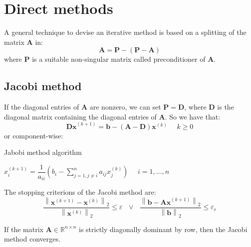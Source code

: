 \documentclass[12pt, a4paper]{report}
\begin{document}
    \section{Direct methods}
    A general technique to devise an iterative method is based on a splitting of the matrix $\boldsymbol{A}$ in: 
    \[\boldsymbol{A}=\boldsymbol{P}-\left(\boldsymbol{P}-\boldsymbol{A}\right)\]
    where $\boldsymbol{P}$ is a suitable non-singular matrix called preconditioner of $\boldsymbol{A}$. 

    \subsection{Jacobi method}
    If the diagonal entries of $\boldsymbol{A}$ are nonzero, we can set $\boldsymbol{P}=\boldsymbol{D}$, where $\boldsymbol{D}$ is the diagonal matrix containing the diagonal 
    entries of $\boldsymbol{A}$. So we have that: 
    \[\boldsymbol{Dx}^{(k+1)}=\boldsymbol{b}-\left( \boldsymbol{A}-\boldsymbol{D} \right)\boldsymbol{x}^{(k)} \:\:\:\:\:\: k \geq 0\]
    or component-wise: 
    \begin{algorithm}[H]
        \caption{Jabobi method algorithm}
            \begin{algorithmic}[1]
                \State $x_i^{(k+1)}=\dfrac{1}{a_{ii}}\left( b_i-\sum_{j=1,j \neq i}^{n}a_{ij}x_j^{(k)}\right) \:\:\:\:\:\: i=1,\dots,n $
            \end{algorithmic}
    \end{algorithm}
    The stopping criterions of the Jacobi method are: 
    \[\dfrac{\left\lVert \boldsymbol{x}^{(k+1)}-\boldsymbol{x}^{(k)} \right\rVert_2}{\left\lVert \boldsymbol{x}^{(k)} \right\rVert_2} \leq \varepsilon \:\:\: \lor \:\:\: \dfrac{\left\lVert \boldsymbol{b}-\boldsymbol{Ax}^{(k+1)} \right\rVert_2}{\left\lVert \boldsymbol{b} \right\rVert_2} \leq \varepsilon_r\]
    \begin{proposition}
        If the matrix $\boldsymbol{A} \in \mathbb{R}^{n \times n}$ is strictly diagonally dominant by row, then the Jacobi method converges. 
    \end{proposition}
\end{document}
